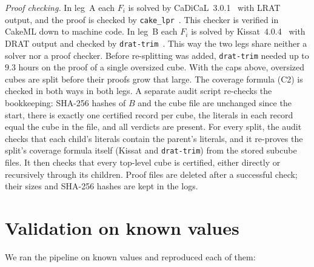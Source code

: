 \documentclass[11pt]{amsart}
\theoremstyle{definition}
\theoremstyle{remark}
\begin{document}
\noindent\emph{Proof checking.} In leg~A each $F_i$ is solved by CaDiCaL~3.0.1~\cite{CaDiCaL2} with LRAT output, and the proof is
checked by \texttt{cake\_lpr}~\cite{cakelpr}. This checker is verified in CakeML down to machine code. In leg~B each $F_i$ is solved by
Kissat~4.0.4~\cite{Kissat24} with DRAT output and checked by \texttt{drat-trim}~\cite{DRATtrim}. This way the two legs share neither a
solver nor a proof checker. Before re-splitting was added, \texttt{drat-trim} needed up to $9.3$ hours on the proof of a single
oversized cube. With the caps above, oversized cubes are split before their proofs grow that large. The coverage formula (C2) is checked
in both ways in both legs. A separate audit script re-checks the bookkeeping: SHA-256 hashes of $B$ and the cube file are unchanged
since the start, there is exactly one certified record per cube, the literals in each record equal the cube in the file, and all
verdicts are present. For every split, the audit checks that each child's literals contain the parent's literals, and it re-proves the
split's coverage formula itself (Kissat and \texttt{drat-trim}) from the stored subcube files. It then checks that every top-level cube is
certified, either directly or recursively through its children. Proof files are deleted after a successful check; their sizes and SHA-256 hashes are kept in the logs.

\section{Validation on known values}\label{sec:valid}
We ran the pipeline on known values and reproduced each of them:
\end{document}
